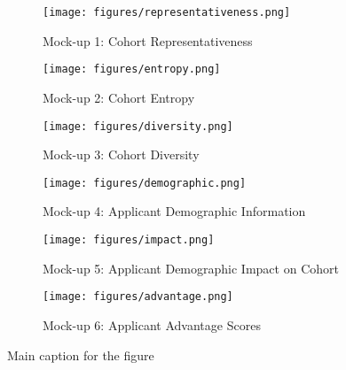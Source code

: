 \begin{figure}[htbp]
    \centering
    \begin{subfigure}[b]{0.3\textwidth}
        \texttt{[image: figures/representativeness.png]}
        \caption{Mock-up 1: Cohort Representativeness}
        \label{fig:representativeness}
    \end{subfigure}
    \hfill
    \begin{subfigure}[b]{0.3\textwidth}
        \texttt{[image: figures/entropy.png]}
        \caption{Mock-up 2: Cohort Entropy}
        \label{fig:entropy}
    \end{subfigure}
    \hfill
    \begin{subfigure}[b]{0.3\textwidth}
        \texttt{[image: figures/diversity.png]}
        \caption{Mock-up 3: Cohort Diversity}
        \label{fig:diversity}
    \end{subfigure}

    \medskip

    \begin{subfigure}[b]{0.3\textwidth}
        \texttt{[image: figures/demographic.png]}
        \caption{Mock-up 4: Applicant Demographic Information}
        \label{fig:demographic}
    \end{subfigure}
    \hfill
    \begin{subfigure}[b]{0.3\textwidth}
        \texttt{[image: figures/impact.png]}
        \caption{Mock-up 5: Applicant Demographic Impact on Cohort}
        \label{fig:impact}
    \end{subfigure}
    \hfill
    \begin{subfigure}[b]{0.3\textwidth}
        \texttt{[image: figures/advantage.png]}
        \caption{Mock-up 6: Applicant Advantage Scores}
        \label{fig:advantage}
    \end{subfigure}
    \caption{Main caption for the figure}
    \label{fig:mockups}
\end{figure}